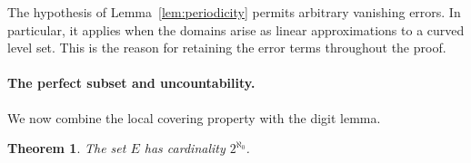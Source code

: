 \documentclass[11pt,a4paper]{amsart}
\numberwithin{equation}{section}
\newtheorem{theorem}{Theorem}[section]
\theoremstyle{definition}
\begin{document}
The hypothesis of Lemma~\ref{lem:periodicity} permits arbitrary
vanishing errors. In particular, it applies when the domains arise
as linear approximations to a curved level set. This is the reason
for retaining the error terms throughout the proof.

\paragraph{The perfect subset and uncountability.}\label{sec:main}

We now combine the local covering property with the digit lemma.

\begin{theorem}\label{thm:main}
The set \(E\) has cardinality \(2^{\aleph_0}\).
\end{theorem}
\end{document}
